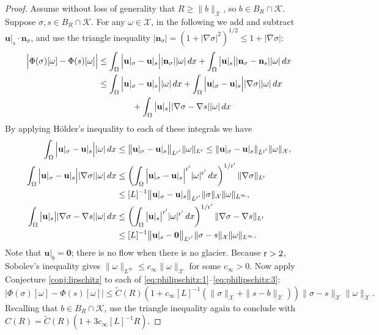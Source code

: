 \documentclass[10pt,a4paper]{amsart}
\newcommand{\bn}{\mathbf{n}}
\newcommand{\bu}{\mathbf{u}}
\newcommand{\bzero}{\bm{0}}
\newcommand{\cK}{\mathcal{K}}
\newcommand{\cX}{\mathcal{X}}
\newcommand{\grad}{\nabla}
\newcommand{\rr}{{\text{\textnormal{r}}}}
\begin{document}
\begin{proof}  Assume without loss of generality that $R\ge \|b\|_\cX$, so $b\in B_R \cap \cK$.  Suppose $\sigma,s\in B_R \cap \cK$.  For any $\omega\in\cX$, in the following we add and subtract $\bu|_s \cdot \bn_\sigma$, and use the triangle inequality $|\bn_\sigma|=\left(1+|\grad \sigma|^2\right)^{1/2} \le 1 + |\grad \sigma|$:
\begin{align}
\Big|\Phi(\sigma)[\omega] - \Phi(s)[\omega]\Big| &\le \int_\Omega \Big|\bu|_\sigma - \bu|_s\Big| |\bn_\sigma| |\omega|\,dx + \int_\Omega \big|\bu|_s\big| |\bn_\sigma-\bn_s| |\omega|\,dx \\
    &\le \int_\Omega \Big|\bu|_\sigma - \bu|_s\Big| |\omega|\,dx + \int_\Omega \Big|\bu|_\sigma - \bu|_s\Big| |\grad \sigma| |\omega|\,dx \notag \\
    &\qquad\qquad + \int_\Omega \big|\bu|_s\big| |\grad \sigma-\grad s| |\omega|\,dx \notag
\end{align}
By applying H\"older's inequality to each of these integrals we have
\begin{align}
\int_\Omega \Big|\bu|_\sigma - \bu|_s\Big| |\omega|\,dx &\le \big\|\bu|_\sigma - \bu|_s\big\|_{L^{\rr'}} \|\omega\|_{L^{\rr}} \le \|\bu|_\sigma - \bu|_s\|_{L^{\rr'}} \|\omega\|_{\cX}, \label{eq:philipschitz:1} \\
\int_\Omega \Big|\bu|_\sigma - \bu|_s\Big| |\grad \sigma| |\omega|\,dx &\le \left(\int_\Omega \Big|\bu|_\sigma - \bu|_s\Big|^{\rr'} |\omega|^{\rr'}\, dx\right)^{1/\rr'} \|\grad \sigma\|_{L^\rr} \label{eq:philipschitz:2} \\
    &\le [L]^{-1} \big\|\bu|_\sigma - \bu|_s\big\|_{L^{\rr'}} \|\sigma\|_{\cX} \|\omega\|_{L^\infty}, \notag \\
\int_\Omega \big|\bu|_s\big| |\grad \sigma-\grad s| |\omega|\,dx &\le \left(\int_\Omega \big|\bu|_s\big|^{\rr'} |\omega|^{\rr'}\, dx\right)^{1/\rr'} \|\grad \sigma- \grad s\|_{L^\rr}  \label{eq:philipschitz:3} \\
    &\le [L]^{-1} \big\|\bu|_s - \bzero\big\|_{L^{\rr'}} \|\sigma-s\|_{\cX} \|\omega\|_{L^\infty}. \notag
\end{align}
Note that $\bu|_b=\bzero$; there is no flow when there is no glacier.  Because $\rr>2$, Sobolev's inequality gives $\|\omega\|_{L^\infty} \le c_\infty \|\omega\|_\cX$ for some $c_\infty>0$.  Now apply Conjecture \ref{conj:lipschitz} to each of \eqref{eq:philipschitz:1}--\eqref{eq:philipschitz:3}:
\begin{equation}
\big|\Phi(\sigma)[\omega] - \Phi(s)[\omega]\big| \le \tilde C(R) \left(1 + c_\infty [L]^{-1} \left(\|\sigma\|_{\cX} + \|s - b\|_{\cX}\right)\right) \|\sigma-s\|_{\cX} \|\omega\|_{\cX}.
\end{equation}
Recalling that $b\in B_R\cap \cK$, use the triangle inequality again to conclude with $C(R) = \tilde C(R) \left(1 + 3 c_\infty [L]^{-1} R\right)$.
\end{proof}
\end{document}
